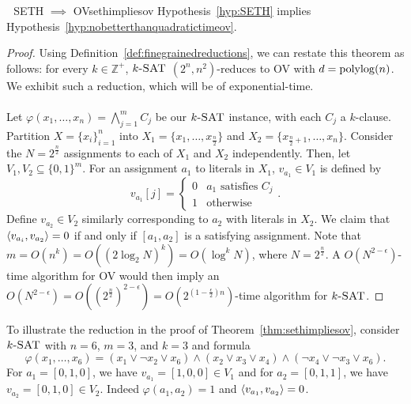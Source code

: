         \begin{theorem}{\Stop\,\,\cite{williams2005twoconstraintsat} SETH \(\implies\) OV}{sethimpliesov}
            Hypothesis~\ref{hyp:SETH} implies Hypothesis~\ref{hyp:nobetterthanquadratictimeov}.
            \begin{proof}
                Using Definition~\ref{def:finegrainedreductions}, we can restate this theorem as follows: for every \(k\in\mathbb{Z}^+\), \(k\textsc{-SAT}\) \((2^n,n^2)\)-reduces to \textsc{OV} with \(d=\operatorname{polylog}(n)\). We exhibit such a reduction, which will be of exponential-time.
                \\
                \\
                Let \(\varphi(x_1,\ldots,x_n)=\bigwedge_{j=1}^m C_j\) be our \(k\textsc{-SAT}\) instance, with each \(C_j\) a \(k\)-clause. Partition \(X=\{x_i\}_{i=1}^n\) into \(X_1=\{x_1,\ldots,x_{\frac{n}{2}}\}\) and \(X_2=\{x_{\frac{n}{2}+1},\ldots,x_n\}\). Consider the \(N=2^\frac{n}{2}\) assignments to each of \(X_1\) and \(X_2\) independently. Then, let \(V_1,V_2\subseteq\{0,1\}^m\). For an assignment \(a_1\) to literals in \(X_1\), \(v_{a_1}\in V_1\) is defined by
                \begin{equation*}
                    v_{a_1}[j]=\begin{cases}
                    0 & a_1\text{ satisfies }C_j \\
                    1 & \text{otherwise}
                    \end{cases}.
                \end{equation*}
                Define \(v_{a_2}\in V_2\) similarly corresponding to \(a_2\) with literals in \(X_2\). We claim that \(\left\langle v_{a_i},v_{a_2}\right\rangle=0\) if and only if \([a_1,a_2]\) is a satisfying assignment. Note that \(m=O(n^k)=O((2\log_2N)^k)=O(\log^kN)\), where \(N=2^\frac{n}{2}\). A \(O\left(N^{2-\epsilon}\right)\)-time algorithm for \textsc{OV} would then imply an \(O\left(N^{2-\epsilon}\right)=O\left(\left(2^\frac{n}{2}\right)^{2-\epsilon}\right)=O\left(2^{\left(1-\frac{\epsilon}{2}\right)n}\right)\)-time algorithm for \(k\textsc{-SAT}\). 
            \end{proof}
        \end{theorem}
        \begin{example}
            To illustrate the reduction in the proof of Theorem~\ref{thm:sethimpliesov}, consider \(k\textsc{-SAT}\) with \(n=6\), \(m=3\), and \(k=3\) and formula
            \begin{equation*}
                \varphi(x_1,\ldots,x_6)=(x_1\vee\neg x_2\vee x_6)\wedge(x_2\vee x_3\vee x_4)\wedge (\neg x_4\vee \neg x_3\vee x_6).
            \end{equation*}
            For \(a_1=[0,1,0]\), we have \(v_{a_1}=[1,0,0]\in V_1\) and for \(a_2=[0,1,1]\), we have \(v_{a_2}=[0,1,0]\in V_2\). Indeed \(\varphi(a_1,a_2)=1\) and \(\left\langle v_{a_1},v_{a_2}\right\rangle=0\).
        \end{example}

